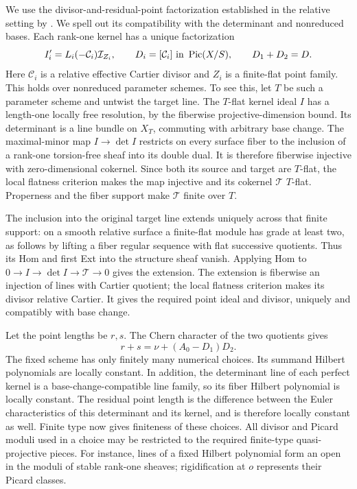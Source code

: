 We use the divisor-and-residual-point factorization established in the
relative setting by \cite[Theorem~1.4]{Fogarty}. We spell out its
compatibility with the determinant and nonreduced bases.
Each rank-one kernel has a unique factorization
\begin{equation}
\label{eq:fixed-factorization}
 I'_i=L_i(-\mathcal C_i)\mathcal I_{Z_i},
 \qquad D_i=[\mathcal C_i]\text{ in }\operatorname{Pic}(X/S),
 \qquad D_1+D_2=D.
\end{equation}
Here \(\mathcal C_i\) is a relative effective Cartier divisor and \(Z_i\)
is a finite-flat point family.
This holds over nonreduced parameter schemes. To see this, let \(T\)
be such a parameter scheme and untwist the target line.
The \(T\)-flat kernel ideal \(I\) has a length-one locally free
resolution, by the fiberwise projective-dimension bound.
Its determinant is a line bundle on \(X_T\), commuting with arbitrary
base change. The maximal-minor map \(I\to\det I\) restricts on every
surface fiber to the inclusion of a rank-one torsion-free sheaf into
its double dual. It is therefore fiberwise injective with
zero-dimensional cokernel. Since both its source and target are
\(T\)-flat, the local flatness criterion makes the map injective
and its cokernel \(\mathcal T\) \(T\)-flat. Properness and the fiber
support make \(\mathcal T\) finite over \(T\).

The inclusion into the original target line extends uniquely across
that finite support: on a smooth relative surface a finite-flat
module has grade at least two, as follows by lifting a fiber regular
sequence with flat successive quotients. Thus its Hom and first Ext
into the structure sheaf vanish. Applying Hom to
\(0\to I\to\det I\to\mathcal T\to0\) gives the extension.
The extension is fiberwise an injection of lines with Cartier
quotient; the local flatness criterion makes its divisor relative
Cartier. It gives the required point ideal and divisor, uniquely and
compatibly with base change.

Let the point lengths be \(r,s\). The Chern character of the two
quotients gives
\begin{equation}
\label{eq:fixed-lengths}
 r+s=\nu+(A_0-D_1)D_2.
\end{equation}
The fixed scheme has only finitely many numerical choices.
Its summand Hilbert polynomials are locally constant.
In addition, the determinant line of each perfect kernel is a
base-change-compatible line family, so its fiber Hilbert polynomial
is locally constant. The residual point length is the difference
between the Euler characteristics of this determinant and its
kernel, and is therefore locally constant as well.
Finite type now gives finiteness of these choices.
All divisor and Picard moduli
used in a choice may be restricted to the required finite-type
quasi-projective pieces. For instance, lines of a fixed Hilbert
polynomial form an open in the moduli of stable rank-one sheaves;
rigidification at \(o\) represents their Picard classes.

